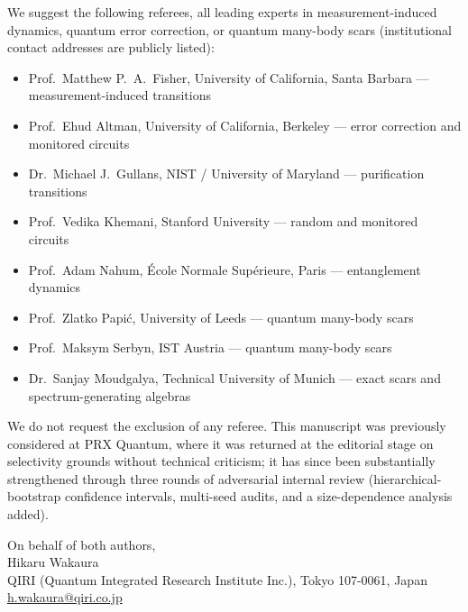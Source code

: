 \documentclass[11pt]{article}
\begin{document}
\noindent We suggest the following referees, all leading experts in
measurement-induced dynamics, quantum error correction, or quantum many-body
scars (institutional contact addresses are publicly listed):

\begin{itemize}\itemsep2pt
  \item Prof.\ Matthew P.~A.\ Fisher, University of California, Santa Barbara ---
        measurement-induced transitions
  \item Prof.\ Ehud Altman, University of California, Berkeley ---
        error correction and monitored circuits
  \item Dr.\ Michael J.~Gullans, NIST / University of Maryland ---
        purification transitions
  \item Prof.\ Vedika Khemani, Stanford University --- random and monitored
        circuits
  \item Prof.\ Adam Nahum, \'Ecole Normale Sup\'erieure, Paris --- entanglement
        dynamics
  \item Prof.\ Zlatko Papi\'c, University of Leeds --- quantum many-body scars
  \item Prof.\ Maksym Serbyn, IST Austria --- quantum many-body scars
  \item Dr.\ Sanjay Moudgalya, Technical University of Munich --- exact scars and
        spectrum-generating algebras
\end{itemize}

\noindent We do not request the exclusion of any referee. This manuscript was
previously considered at PRX Quantum, where it was returned at the editorial
stage on selectivity grounds without technical criticism; it has since been
substantially strengthened through three rounds of adversarial internal review
(hierarchical-bootstrap confidence intervals, multi-seed audits, and a
size-dependence analysis added).

\vspace{1em}

\noindent On behalf of both authors,\\
Hikaru Wakaura\\
QIRI (Quantum Integrated Research Institute Inc.), Tokyo 107-0061, Japan\\
\href{mailto:h.wakaura@qiri.co.jp}{h.wakaura@qiri.co.jp}
\end{document}
